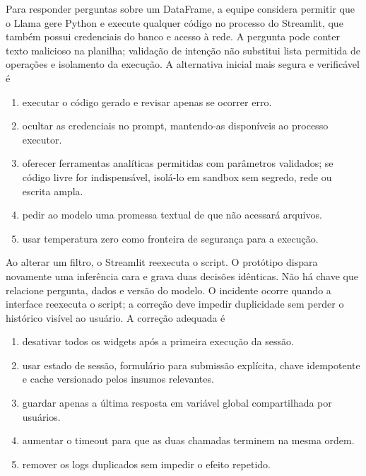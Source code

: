 \TextoBase
Para responder perguntas sobre um DataFrame, a equipe considera permitir que o Llama gere Python e execute qualquer código no processo do Streamlit, que também possui credenciais do banco e acesso à rede.
A pergunta pode conter texto malicioso na planilha; validação de intenção não substitui lista permitida de operações e isolamento da execução.
\FonteDidatica
\Comando A alternativa inicial mais segura e verificável é
\begin{enumerate}[label=\Alph*)]
\item executar o código gerado e revisar apenas se ocorrer erro.
\item ocultar as credenciais no prompt, mantendo-as disponíveis ao processo executor.
\item oferecer ferramentas analíticas permitidas com parâmetros validados; se código livre for indispensável, isolá-lo em sandbox sem segredo, rede ou escrita ampla.
\item pedir ao modelo uma promessa textual de que não acessará arquivos.
\item usar temperatura zero como fronteira de segurança para a execução.
\end{enumerate}

\TextoBase
Ao alterar um filtro, o Streamlit reexecuta o script. O protótipo dispara novamente uma inferência cara e grava duas decisões idênticas. Não há chave que relacione pergunta, dados e versão do modelo.
O incidente ocorre quando a interface reexecuta o script; a correção deve impedir duplicidade sem perder o histórico visível ao usuário.
\FonteDidatica
\Comando A correção adequada é
\begin{enumerate}[label=\Alph*)]
\item desativar todos os widgets após a primeira execução da sessão.
\item usar estado de sessão, formulário para submissão explícita, chave idempotente e cache versionado pelos insumos relevantes.
\item guardar apenas a última resposta em variável global compartilhada por usuários.
\item aumentar o timeout para que as duas chamadas terminem na mesma ordem.
\item remover os logs duplicados sem impedir o efeito repetido.
\end{enumerate}

